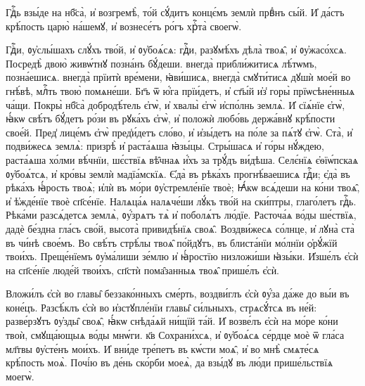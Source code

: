 \hKv Гдⷭ҇ь взы́де на нб҃са̀, и҆ возгремѣ̀, то́й  сꙋ́дитъ концє́мъ землѝ првⷣнъ сы́й. 
\hKv И҆ да́стъ  крѣ́пость царю̀ на́шемꙋ, и҆ вознесе́тъ ро́гъ хрⷭ҇та̀  своегѡ̀.  

%

\cuLettrine
Гдⷭ҇и, ᲂу҆слы́шахъ слꙋ́хъ тво́й, и҆ ᲂу҆боѧ́сѧ:  гдⷭ҇и, разꙋмѣ́хъ дѣла̀ твоѧ̑, и҆ ᲂу҆жасо́хсѧ. 
\hKv  Посредѣ̀ двою̀ живѡ́тнꙋ позна́нъ бꙋ́деши. внегда̀  прибли́житисѧ лѣ́тѡмъ, позна́ешисѧ. внегда̀ прїитѝ  вре́мени, ꙗ҆ви́шисѧ, 
внегда̀ смꙋти́тисѧ дꙋшѝ мое́й во  гнѣ́вѣ, млⷭ҇ть твою̀ помѧне́ши. 
\hKv Бг҃ъ ѿ ю҆́га  прїи́детъ, и҆ ст҃ы́й и҆з̾ горы̀ прїѡсѣне́нныѧ ча́щи. 
\hKv  Покры̀ нб҃са̀ добродѣ́тель є҆гѡ̀, и҆ хвалы̀ є҆гѡ̀  и҆спо́лнь землѧ̀. 
\hKv И҆ сїѧ́нїе є҆гѡ̀, ꙗ҆́кѡ свѣ́тъ  бꙋ́детъ ро́зи въ рꙋка́хъ є҆гѡ̀, и҆ положѝ любо́вь  держа́внꙋ крѣ́пости свое́й. 
\hKv Пред̾ лице́мъ є҆гѡ̀  пред̾и́детъ сло́во, и҆ и҆зы́детъ на по́ле за  пѧ́тꙋ є҆гѡ̀. 
\hKv Ста̀, и҆  подви́жесѧ землѧ̀: призрѣ̀ и҆ раста́ѧша ꙗ҆зы́цы. 
\hKv  Стры́шасѧ и҆ го́ры нꙋ́ждею, раста́ѧша хо́лми вѣ́чнїи,  шє́ствїѧ вѣ̑чнаѧ и҆́хъ за трꙋ́дъ ви́дѣша. 
\hKv Селє́нїѧ  є҆ѳїѡ́пскаѧ ᲂу҆боѧ́тсѧ, и҆ кро́вы землѝ мадїа́мскїѧ.  
\hKv Є҆да̀ въ рѣка́хъ прогнѣ́ваешисѧ гдⷭ҇и; є҆да̀ въ  рѣка́хъ ꙗ҆́рость твоѧ̀; и҆лѝ въ мо́ри ᲂу҆стремле́нїе  твоѐ; 
\hKv Ꙗ҆́кѡ всѧ́деши на ко́ни твоѧ̑, и҆ ѣ҆жде́нїе  твоѐ сп҃се́нїе. 
\hKv Налѧца́ѧ налѧче́ши лꙋ́къ тво́й на  ски́птры, глаго́летъ гдⷭ҇ь. 
\hKv Рѣка́ми разсѧ́детсѧ  землѧ̀, ᲂу҆́зрѧтъ тѧ̀ и҆ поболѧ́тъ лю́дїе. 
\hKv Расточа́ѧ  во́ды ше́ствїѧ, дадѐ бе́здна гла́съ сво́й, высота̀  привидѣ́нїѧ своѧ̑. 
\hKv Воздви́жесѧ со́лнце, и҆ лꙋна̀  ста̀ въ чи́нѣ свое́мъ. 
\hKv Во свѣ́тъ стрѣ́лы твоѧ̑  по́йдꙋтъ, въ блиста́нїи мо́лнїи ѻ҆рꙋ́жїй твои́хъ. 
\hKv  Преще́нїемъ ᲂу҆ма́лиши зе́млю и҆ ꙗ҆́ростїю низложи́ши  ꙗ҆зы́ки. И҆зше́лъ є҆сѝ на сп҃се́нїе люде́й твои́хъ,  сп҃стѝ пома̑занныѧ твоѧ̑ прише́лъ є҆сѝ.  
%

\hKv Вложи́лъ є҆сѝ во главы̑ беззако́нныхъ  сме́рть, воздви́глъ є҆сѝ ᲂу҆́за да́же до вы́и въ коне́цъ.  
\hKv Разсѣ́клъ є҆сѝ во и҆зстꙋпле́нїи главы̑ си́льныхъ,  стрѧсꙋ́тсѧ въ не́й: разве́рзꙋтъ ᲂу҆зды̑ своѧ̑, ꙗ҆́кѡ  снѣда́ѧй ни́щїй та́й. 
\hKv И҆ возве́лъ є҆сѝ на мо́ре  ко́ни твоѝ, смꙋща́ющыѧ во́ды мнѡ́ги. к҃в Сохрани́хсѧ, и҆  ᲂу҆боѧ́сѧ се́рдце моѐ ѿ гла́са мл҃твы ᲂу҆сте́нъ мои́хъ.  
\hKv И҆ вни́де тре́петъ въ кѡ́сти моѧ̑, и҆ во мнѣ̀  смѧте́сѧ крѣ́пость моѧ̀. 
\hKv Почі́ю въ де́нь ско́рби  моеѧ̀, да взы́дꙋ въ лю́ди прише́льствїѧ моегѡ̀. 
%


